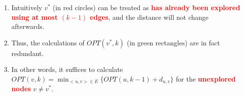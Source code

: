 \documentclass[mathserif]{beamer}
\begin{document}
{\begin{figure}
\begin{minipage}{0.45\textwidth}
 
 \end{minipage}
\end{figure}

\begin{enumerate}
\item  Intuitively $v^*$ (in red circles) can be treated as \textcolor{red}{\bf has already been explored using at most $(k-1)$ edges}, and the distance will not change afterwards.
\item  Thus, the calculations of $OPT(v^*, k)$ (in green rectangles) are in fact redundant.
\item In other words, it suffices to calculate $OPT( v, k) = \min_{<u,v>\in E} \{ OPT( u, k-1) + d_{u,v} \}$ for the \textcolor{red}{\bf unexplored nodes} $v \neq v^*$.
\end{enumerate}
}

\end{document}

